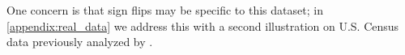 One concern is that sign flips may be specific to this dataset; in \cref{appendix:real_data} we address this with a second illustration on U.S. Census data previously analyzed by \citet{bach2024heterogeneity}.

